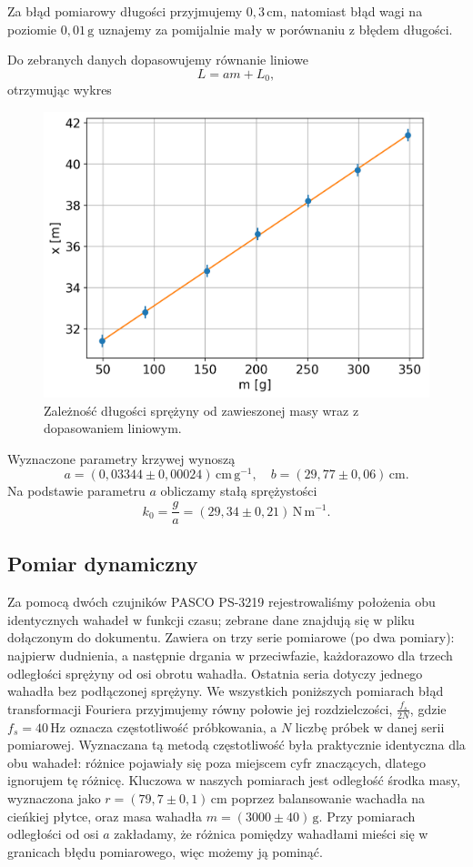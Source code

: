 \documentclass[12pt]{article}
\begin{document}
Za błąd pomiarowy długości przyjmujemy \(0{,}3\,\mathrm{cm}\), natomiast błąd wagi na poziomie \(0{,}01\,\mathrm{g}\) uznajemy za pomijalnie mały w porównaniu z błędem długości.

Do zebranych danych dopasowujemy równanie liniowe
\[
	L = a m + L_0,
\]
otrzymując wykres
\begin{figure}[H]
	\centering
	\includegraphics[scale=0.6]{spring_mass}
	\caption{Zależność długości sprężyny od zawieszonej masy wraz z dopasowaniem liniowym.}
	\label{fig:spring_mass}
\end{figure}
Wyznaczone parametry krzywej wynoszą
\[
	a = (0{,}03344 \pm 0{,}00024)\,\mathrm{cm\,g^{-1}}, \quad b = (29{,}77 \pm 0{,}06)\,\mathrm{cm}.
\]
Na podstawie parametru \(a\) obliczamy stałą sprężystości
\[
	k_0 = \frac{g}{a} = (29{,}34 \pm 0{,}21)\,\mathrm{N\,m^{-1}}.
\]

\subsection{Pomiar dynamiczny}
Za pomocą dwóch czujników PASCO PS-3219 rejestrowaliśmy położenia obu identycznych wahadeł w funkcji czasu; zebrane dane znajdują się w pliku dołączonym do dokumentu. Zawiera on trzy serie pomiarowe (po dwa pomiary): najpierw dudnienia, a następnie drgania w przeciwfazie, każdorazowo dla trzech odległości sprężyny od osi obrotu wahadła. Ostatnia seria dotyczy jednego wahadła bez podłączonej sprężyny. We wszystkich poniższych pomiarach błąd transformacji Fouriera przyjmujemy równy połowie jej rozdzielczości, \(\tfrac{f_s}{2N}\), gdzie \(f_s = 40\,\mathrm{Hz}\) oznacza częstotliwość próbkowania, a \(N\) liczbę próbek w danej serii pomiarowej. Wyznaczana tą metodą częstotliwość była praktycznie identyczna dla obu wahadeł: różnice pojawiały się poza miejscem cyfr znaczących, dlatego ignorujem tę różnicę. Kluczowa w naszych pomiarach jest odległość środka masy, wyznaczona jako \(r = (79{,}7 \pm 0{,}1) \,\mathrm{cm}\) poprzez balansowanie wachadła na cieńkiej płytce, oraz masa wahadła \(m = (3000 \pm 40)\,\mathrm{g}\). Przy pomiarach odległości od osi \(a\) zakładamy, że różnica pomiędzy wahadłami mieści się w granicach błędu pomiarowego, więc możemy ją pominąć.
\end{document}
